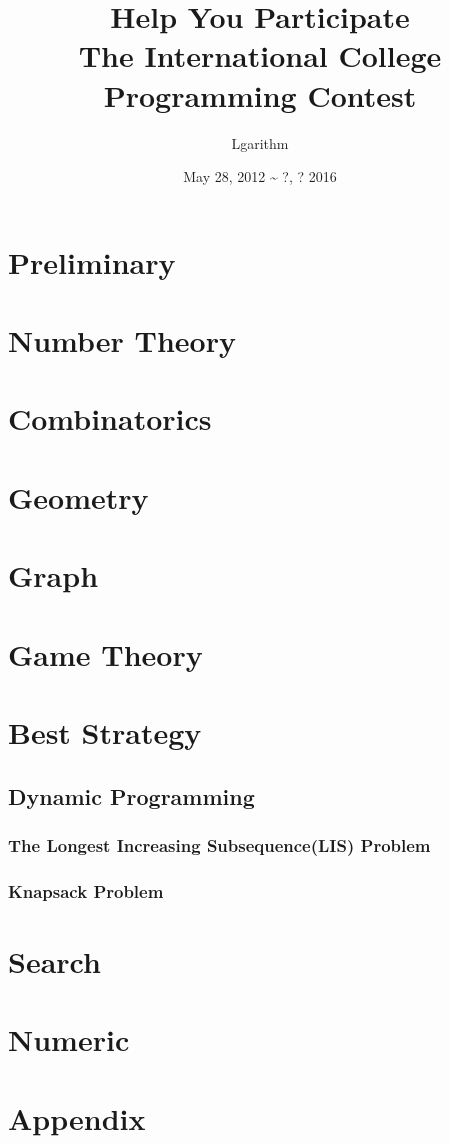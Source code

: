 \documentclass{book}
\date{May 28, 2012 \~{ } ?, ? 2016}
\title{{\Huge Help You Participate}\\
  {\large The International College Programming Contest}}
\author{Lgarithm}
\begin{document}
\maketitle
\tableofcontents
\chapter{Preliminary}

\chapter{Number Theory}

\chapter{Combinatorics}

\chapter{Geometry}

\chapter{Graph}

\chapter{Game Theory}

\chapter{Best Strategy}
  \section{Dynamic Programming}
    \subsection{The Longest Increasing Subsequence(LIS) Problem}
    \subsection{Knapsack Problem}
\chapter{Search}

\chapter{Numeric}


\chapter*{Appendix}




\printindex
\end{document}
